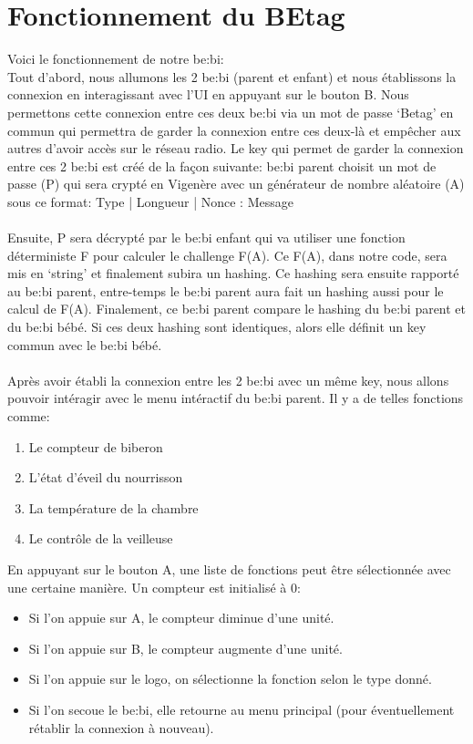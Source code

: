 \documentclass [11pt]{article}
\begin{document}
\section{Fonctionnement du BEtag}
Voici le fonctionnement de notre be\string:bi\string:
\\ Tout d’abord, nous allumons les 2 be\string:bi (parent et enfant) et nous établissons la connexion en interagissant avec l’UI en appuyant sur le bouton B. Nous permettons cette connexion entre ces deux be\string:bi via un mot de passe ‘Betag’ en commun qui permettra de garder la connexion entre ces deux-là et empêcher aux autres d’avoir accès sur le réseau radio. Le key qui permet de garder la connexion entre ces 2 be\string:bi est créé de la façon suivante\string:
be\string:bi parent choisit un mot de passe (P) qui sera crypté en Vigenère avec un générateur de nombre aléatoire (A) sous ce format\string: Type | Longueur | Nonce : Message
\\
\\ Ensuite, P sera décrypté par le be\string:bi enfant qui va utiliser une fonction déterministe F pour calculer le challenge F(A). Ce F(A), dans notre code, sera mis en ‘string’ et finalement subira un hashing.
\noindent Ce hashing sera ensuite rapporté au be\string:bi parent, entre-temps le be\string:bi parent aura fait un hashing aussi pour le calcul de F(A). Finalement, ce be\string:bi parent compare le hashing du be\string:bi parent et du be\string:bi bébé. Si ces deux hashing sont identiques, alors elle définit un key commun avec le be\string:bi bébé.
\\
\\
\noindent Après avoir établi la connexion entre les 2 be\string:bi avec un même key, nous allons pouvoir intéragir avec le menu intéractif du be\string:bi parent. Il y a de telles fonctions comme:
\begin{enumerate}
\item Le compteur de biberon
\item L’état d’éveil du nourrisson
\item La température de la chambre
\item Le contrôle de la veilleuse
\end{enumerate}
\noindent En appuyant sur le bouton A, une liste de fonctions peut être sélectionnée avec une certaine manière. Un compteur est initialisé à 0:
\begin{itemize}
    \item[\textbullet] Si l'on appuie sur A, le compteur diminue d'une unité.
    \item[\textbullet] Si l'on appuie sur B, le compteur augmente d'une unité.
    \item[\textbullet] Si l'on appuie sur le logo, on sélectionne la fonction selon le type donné.
    \item[\textbullet] Si l'on secoue le be\string:bi, elle retourne au menu principal (pour éventuellement rétablir la connexion à nouveau).
\end{itemize}
\end{document}
